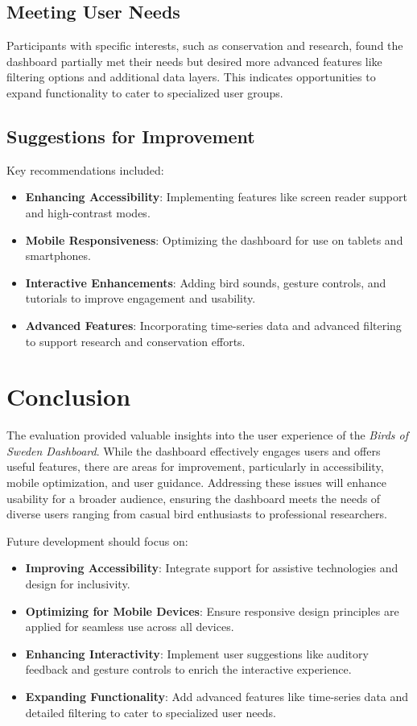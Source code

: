 \subsection{Meeting User Needs}

Participants with specific interests, such as conservation and research, found the dashboard partially met their needs but desired more advanced features like filtering options and additional data layers. This indicates opportunities to expand functionality to cater to specialized user groups.

\subsection{Suggestions for Improvement}

Key recommendations included:

\begin{itemize}
    \item \textbf{Enhancing Accessibility}: Implementing features like screen reader support and high-contrast modes.
    \item \textbf{Mobile Responsiveness}: Optimizing the dashboard for use on tablets and smartphones.
    \item \textbf{Interactive Enhancements}: Adding bird sounds, gesture controls, and tutorials to improve engagement and usability.
    \item \textbf{Advanced Features}: Incorporating time-series data and advanced filtering to support research and conservation efforts.
\end{itemize}

\section{Conclusion}

The evaluation provided valuable insights into the user experience of the \textit{Birds of Sweden Dashboard}. While the dashboard effectively engages users and offers useful features, there are areas for improvement, particularly in accessibility, mobile optimization, and user guidance. Addressing these issues will enhance usability for a broader audience, ensuring the dashboard meets the needs of diverse users ranging from casual bird enthusiasts to professional researchers.

Future development should focus on:

\begin{itemize}
    \item \textbf{Improving Accessibility}: Integrate support for assistive technologies and design for inclusivity.
    \item \textbf{Optimizing for Mobile Devices}: Ensure responsive design principles are applied for seamless use across all devices.
    \item \textbf{Enhancing Interactivity}: Implement user suggestions like auditory feedback and gesture controls to enrich the interactive experience.
    \item \textbf{Expanding Functionality}: Add advanced features like time-series data and detailed filtering to cater to specialized user needs.
\end{itemize}
